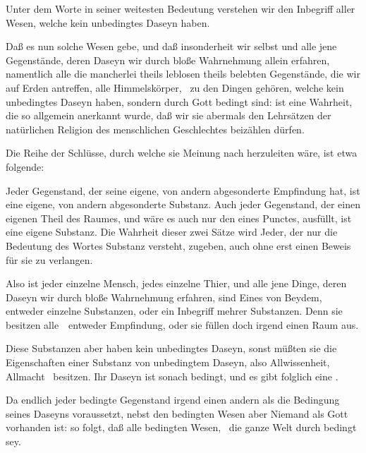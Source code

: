 \begin{aufza} 
\item Unter dem Worte  in seiner weitesten Bedeutung verstehen wir den Inbegriff aller Wesen, welche kein unbedingtes Daseyn haben.
\item Daß es nun solche Wesen gebe, und daß insonderheit wir selbst und alle jene Gegenstände, deren Daseyn wir durch bloße Wahrnehmung allein erfahren, namentlich alle die mancherlei theils leblosen theils belebten Gegenstände, die wir auf Erden antreffen, alle Himmelskörper, \usw\ zu den Dingen gehören, welche kein unbedingtes Daseyn haben, sondern durch Gott bedingt sind: ist eine Wahrheit, die so allgemein anerkannt wurde, daß wir sie abermals den Lehrsätzen der natürlichen Religion des menschlichen Geschlechtes beizählen dürfen.
\item Die Reihe der Schlüsse, durch welche sie  Meinung nach herzuleiten wäre, ist etwa folgende:
\begin{aufzb}
\item Jeder Gegenstand, der seine eigene, von andern abgesonderte Empfindung hat, ist eine eigene, von andern abgesonderte Substanz. Auch jeder Gegenstand, der einen eigenen Theil des Raumes, und wäre es auch nur den eines Punctes, ausfüllt, ist eine eigene Substanz. Die Wahrheit dieser zwei Sätze wird Jeder, der nur die Bedeutung des Wortes Substanz versteht, zugeben, auch ohne erst einen Beweis für sie zu verlangen.
\item Also ist jeder einzelne Mensch, jedes einzelne Thier, und alle jene Dinge, deren Daseyn wir durch bloße Wahrnehmung erfahren, sind Eines von Beydem, entweder einzelne Substanzen, oder ein Inbegriff mehrer Substanzen. Denn sie besitzen alle~\ entweder Empfindung, oder sie füllen doch irgend einen Raum aus.
\item Diese Substanzen aber haben kein unbedingtes Daseyn, sonst müßten sie die Eigenschaften einer Substanz von unbedingtem Daseyn, also Allwissenheit, Allmacht \usw\ besitzen. Ihr Daseyn ist sonach bedingt, und es gibt folglich eine .
\item Da endlich jeder bedingte Gegenstand irgend einen andern als die Bedingung seines Daseyns voraussetzt, nebst den bedingten Wesen aber Niemand als Gott vorhanden ist: so folgt, daß alle bedingten Wesen, \dh\ die ganze Welt durch  bedingt sey.
\end{aufzb}
\end{aufza}

